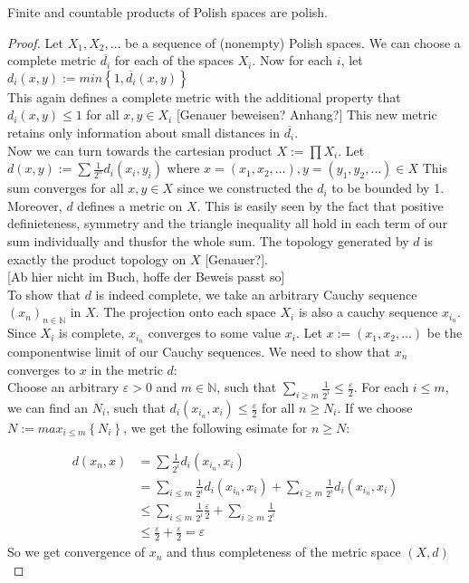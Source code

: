\documentclass[10pt, a4paper, titlepage]{article}
\numberwithin{equation}{section}
\begin{document}
\begin{lemma}
	\label{products}
	Finite and countable products of Polish spaces are polish.
\end{lemma}
\begin{proof}
	Let $X_1,X_2,\ldots$ be a sequence of (nonempty) Polish spaces. We can choose a complete metric $\overline{d_i}$ for each of the spaces $X_i$. 
	Now for each $i$, let $d_i \left( x,y \right) := min \left\{ 1,\overline{d_i} \left( x,y \right)  \right\}$\\
	This again defines a complete metric with the additional property that $d_i\left( x,y \right) \leq 1$ for all $x,y \in X_i$ [Genauer beweisen? Anhang?]
This new metric retains only information about small distances in $\overline{d_i}$.\\
Now we can turn towards the cartesian product $X := \prod X_i$.
Let $d\left( x,y \right):= \sum \frac{1}{2^{n}} d_i\left( x_{i},y_{i} \right)$
where $x = \left( x_1,x_2,\ldots \right), y = \left( y_1,y_2,\ldots \right) \in X$ 
This sum converges for all $x,y \in X$ since we constructed the $d_i$ to be bounded by 1.
 Moreover, $d$ defines a metric on $X$. This is easily seen by the fact that positive definieteness, symmetry and the triangle inequality all hold in each term of our sum individually and thusfor the whole sum. 
 The topology generated by $d$ is exactly the product topology on $X$ [Genauer?].\\

[Ab hier nicht im Buch, hoffe der Beweis passt so] \\
To show that $d$ is indeed complete, we take an arbitrary Cauchy sequence $(x_{n})_{n \in  \mathbb{N}}$ in $X$. The projection onto each  space $X_i$ is also a cauchy sequence  $x_{i_n}$.
 Since $X_i$ is complete, $x_{i_n}$ converges to some value $x_i$. 
Let $x:= \left( x_1,x_2,\ldots \right) $ be the componentwise limit of our Cauchy sequences. We need to show that $x_{n}$ converges to $x$ in the metric $d$:\\
Choose an arbitrary $\varepsilon > 0 $ and $m \in  \mathbb{N}$, such that $\sum_{i \geq m} \frac{1}{2^i} \leq \frac{\varepsilon}{2} $.
For each $i \leq m$, we can find an  $N_i$, such that $d_i\left( x_{i_n},x_i \right) \leq \frac{\varepsilon}{2}$ for all $n\geq N_i$. 
If we choose $N := max_{i \leq m}\left\{ N_i \right\} $, we get the following esimate for $n \geq N$: 

\begin{align*}
	d\left( x_{n},x \right) &= \sum \frac{1}{2^i} d_i\left( x_{i_n},x_i \right)\\
				&= \sum_{i\leq m} \frac{1}{2^i} d_i\left( x_{i_n},x_i \right) + \sum_{i \geq m} \frac{1}{2^i} d_i\left( x_{i_n},x_i \right) \\
				&\leq \sum_{i \leq m} \frac{1}{2^i} \frac{\varepsilon}{2} + \sum_{i\geq m} \frac{1}{2^i} \\
				&\leq \frac{\varepsilon}{2} + \frac{\varepsilon}{2} = \varepsilon
\end{align*}
So we get convergence of $x_n$ and thus completeness of the metric space $\left( X,d \right) $ \\


\end{proof}
\end{document}
